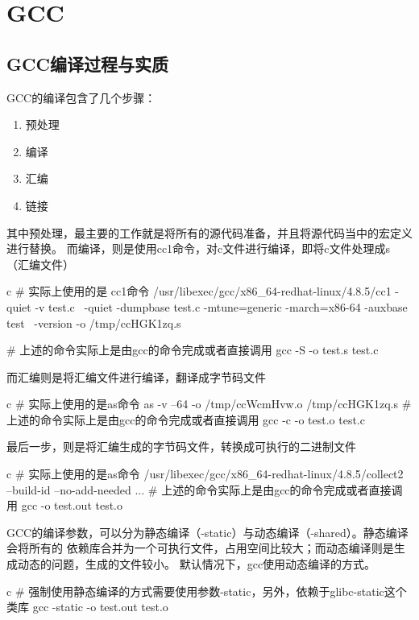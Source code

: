 \chapter{GCC}
\section{GCC编译过程与实质}
\par GCC的编译包含了几个步骤：
\begin{enumerate}
  \item 预处理
  \item 编译
  \item 汇编
  \item 链接
\end{enumerate}

其中预处理，最主要的工作就是将所有的源代码准备，并且将源代码当中的宏定义进行替换。
而编译，则是使用cc1命令，对c文件进行编译，即将c文件处理成s（汇编文件）
\begin{code-block}{c}
# 实际上使用的是 cc1命令
 /usr/libexec/gcc/x86_64-redhat-linux/4.8.5/cc1 -quiet -v test.c \
    -quiet -dumpbase test.c -mtune=generic -march=x86-64 -auxbase test \
    -version -o /tmp/ccHGK1zq.s

# 上述的命令实际上是由gcc的命令完成或者直接调用
gcc -S -o test.s test.c
\end{code-block}

而汇编则是将汇编文件进行编译，翻译成字节码文件
\begin{code-block}{c}
# 实际上使用的是as命令
as -v --64 -o /tmp/ccWcmHvw.o /tmp/ccHGK1zq.s
# 上述的命令实际上是由gcc的命令完成或者直接调用
gcc -c -o test.o test.c
\end{code-block}

最后一步，则是将汇编生成的字节码文件，转换成可执行的二进制文件
\begin{code-block}{c}
# 实际上使用的是as命令
/usr/libexec/gcc/x86_64-redhat-linux/4.8.5/collect2 --build-id --no-add-needed ...
# 上述的命令实际上是由gcc的命令完成或者直接调用
gcc -o test.out test.o
\end{code-block}

GCC的编译参数，可以分为静态编译（-static）与动态编译（-shared）。静态编译会将所有的
依赖库合并为一个可执行文件，占用空间比较大；而动态编译则是生成动态的问题，生成的文件较小。
默认情况下，gcc使用动态编译的方式。
\begin{code-block}{c}
# 强制使用静态编译的方式需要使用参数-static，另外，依赖于glibc-static这个类库
gcc -static -o test.out test.o
\end{code-block}

